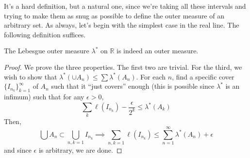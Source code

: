   It's a hard definition, but a natural one, since we're taking all these intervals and trying to make them as snug as possible to define the outer measure of an arbitrary set. As always, let's begin with the simplest case in the real line. The following definition suffices. 

  \begin{lemma}
    The Lebesgue outer measure $\lambda^\ast$ on $\mathbb{R}$ is indeed an outer measure. 
  \end{lemma} 
  \begin{proof}
    We prove the three properties. The first two are trivial. For the third, we wish to show that $\lambda^\ast ( \cup A_n) \leq \sum \lambda^\ast (A_n)$. For each $n$, find a specific cover $\{I_{n_k}\}_{k=1}^\infty$ of $A_n$ such that it ``just covers'' enough (this is possible since $\lambda^\ast$ is an infimum) such that for any $\epsilon > 0$, 
    \begin{equation}
      \sum_k \ell(I_{n_k}) - \frac{\epsilon}{2^k} \leq \lambda^\ast (A_k)
    \end{equation} 
    Then, 
    \begin{equation}
      \bigcup A_n \subset \bigcup_{n, k = 1} I_{n_k} \implies \sum_{n, k = 1} \ell(I_{n_k}) \leq \sum_{n=1}^\infty \lambda^\ast (A_n) + \epsilon
    \end{equation}
    and since $\epsilon$ is arbitrary, we are done. 


\end{proof}
